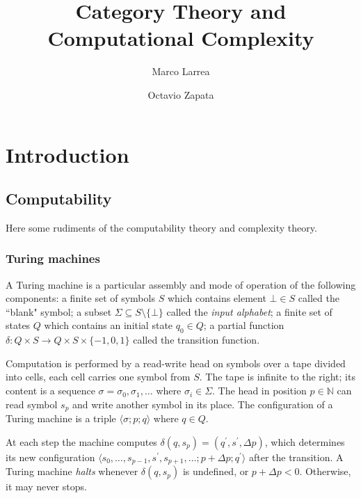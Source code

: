 


\title{Category Theory and \\ Computational Complexity}
\author{Marco Larrea \and Octavio Zapata}


\maketitle

\section{Introduction}

\subsection{Computability}
Here some rudiments of the computability theory and complexity theory.

\subsubsection{Turing machines}\label{ap:1}

A Turing machine is a particular assembly and mode of operation of the following components: a finite set of symbols $S$ which contains element $\bot\in S$ called the ``blank" symbol; a subset $\Sigma\subseteq S\setminus \{\bot\}$ called the \emph{input alphabet}; a finite set of states $Q$ which contains an initial state $q_0\in Q$; a partial function $\delta : Q\times S\rightarrow Q\times S\times\{-1,0,1\}$ called the transition function.

Computation is performed by a read-write head on symbols over a tape divided into cells, each cell carries one symbol from $S$.  The tape is infinite to the right; its content is a sequence $\sigma = \sigma_0, \sigma_1,\dots$ where $\sigma_i\in \Sigma$. The head in position $p\in\mathbb{N}$ can read symbol $s_p$ and write another symbol in its place. The configuration of a Turing machine is a triple $\langle\sigma ; p; q\rangle$ where $q\in Q$.

At each step the machine computes $\delta(q,s_p) = (q^{\prime}, s^{\prime}, \Delta p)$, which determines its new configuration $\langle s_0,\dots,s_{p-1}, s^{\prime},s_{p+1},\dots; p+\Delta p; q^{\prime}\rangle$ after the transition. A Turing machine \emph{halts} whenever $\delta(q,s_p)$ is undefined, or $p+\Delta p < 0$. Otherwise, it may never stops.

